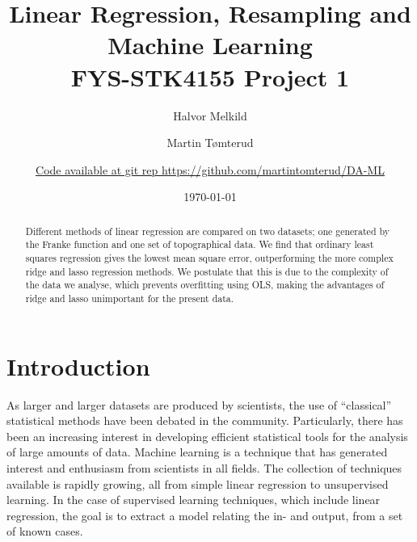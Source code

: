 \documentclass[a4paper, 
amsfonts, 
amssymb, 
amsmath, 
reprint, 
showkeys, 
nofootinbib, 
twoside]{revtex4-2}
\begin{document}
\title{ Linear Regression, Resampling and Machine Learning \\
FYS-STK4155 Project 1}

\author{Halvor Melkild}

\author{Martin Tømterud}

\author{\textcolor{blue}{\href{https://github.com/martintomterud/DA-ML}{Code available at git rep https://github.com/martintomterud/DA-ML}}} 

\date{\today} 

\begin{abstract}
Different methods of linear regression are compared on two datasets; one generated by the Franke function and one set of topographical data. We find that ordinary least squares regression gives the lowest mean square error, outperforming the more complex ridge and lasso regression methods. We postulate that this is due to the complexity of the data we analyse, which prevents overfitting using OLS, making the advantages of ridge and lasso unimportant for the present data.
\end{abstract}


\maketitle


\section{Introduction}

As larger and larger datasets are produced by scientists, the use of ``classical'' statistical methods have been debated in the community. Particularly, there has been an increasing interest in developing efficient statistical tools for the analysis of large amounts of data. Machine learning is a technique that has generated interest and enthusiasm from scientists in all fields. The collection of techniques available is rapidly growing, all from simple linear regression to unsupervised learning. In the case of supervised learning techniques, which include linear regression, the goal is to extract a model relating the in- and output, from a set of known cases. 
\end{document}
